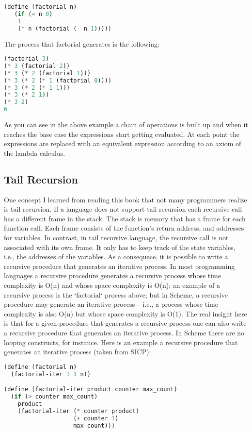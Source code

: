 \documentclass{amsbook}
\begin{document}
\begin{lstlisting}[language=Lisp]
(define (factorial n)
   (if (= n 0)
   	1
   	(* n (factorial (- n 1)))))
\end{lstlisting}

The process that factorial generates is the following:

\begin{lstlisting}[language=Lisp]
(factorial 3)
(* 3 (factorial 2))
(* 3 (* 2 (factorial 1)))
(* 3 (* 2 (* 1 (factorial 0))))
(* 3 (* 2 (* 1 1)))
(* 3 (* 2 1))
(* 3 2)
6
\end{lstlisting}

As you can see in the above example a chain of operations is built up and when it reaches the base case the expressions start getting evaluated. At each point the expressions are replaced with an equivalent expression according to an axiom of the lambda calculus.

\subsection{Tail Recursion}

One concept I learned from reading this book that not many programmers realize is tail recursion. If a language does not support tail recursion each recursive call has a different frame in the stack. The stack is memory that has a frame for each function call. Each frame consists of the function's return address, and addresses for variables. In contrast, in tail recursive language, the recursive call is not associated with its own frame. It only has to keep track of the state variables, i.e., the addresses of the variables. As a consequece, it is possible to write a recursive procedure that generates an iterative process. In most programming languages a recursive procedure generates a recursive process whose time complexity is O(n) and whose space complexity is O(n); an example of a recursive process is the `factorial` process above; but in Scheme, a recursive procedure may generate an iterative process – i.e., a process whose time complexity is also O(n) but whose space complexity is O(1). The real insight here is that for a given procedure that generates a recursive process one can also write a recursive procedure that generates an iterative process. In Scheme there are no looping constructs, for instance. Here is an example a recursive procedure that generates an iterative process (taken from SICP):

\begin{lstlisting}[language=Lisp]
(define (factorial n)
  (factorial-iter 1 1 n))

(define (factorial-iter product counter max_count)
  (if (> counter max_count)
  	product
  	(factorial-iter (* counter product)
                  	(+ counter 1)
                  	max-count)))
\end{lstlisting}
\end{document}
